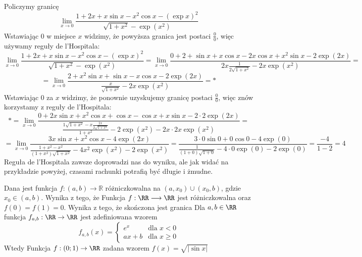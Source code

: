 \begin{example}
    Policzymy granicę
    $$\lim_{x\to0}\frac{1+2x+x\sin{x}-x^2\cos{x}-(\exp{x})^2}{\sqrt{1+x^2}-\exp(x^2)}$$
    Wstawiając 0 w miejsce $x$ widzimy, że powyższa granica jest postaci $\frac{0}{0}$, więc używamy reguły de l'Hospitala:
    $$\lim_{x\to0}\frac{1+2x+x\sin{x}-x^2\cos{x}-(\exp{x})^2}{\sqrt{1+x^2}-\exp(x^2)}=\lim_{x\to0}\frac{0+2+\sin{x}+x\cos{x}-2x\cos{x}+x^2\sin{x}-2\exp(2x)}{2x\frac{1}{2\sqrt{1+x^2}}-2x\exp(x^2)}=$$
    $$=\lim_{x\to0}\frac{2+x^2\sin{x}+\sin{x}-x\cos{x}-2\exp(2x)}{\frac{x}{\sqrt{1+x^2}}-2x\exp(x^2)}=*$$
    Wstawiając 0 za $x$ widzimy, że ponownie uzyskujemy granicę postaci $\frac{0}{0}$, więc znów korzystamy z reguły de l'Hospitala:
    $$*=\lim_{x\to0}\frac{0+2x\sin{x}+x^2\cos{x}+\cos{x}-\cos{x}+x\sin{x}-2\cdot2\exp(2x)}{\frac{1\sqrt{1+x^2}-x\frac{2x}{2\sqrt{1+x^2}}}{1+x^2}-2\exp(x^2)-2x\cdot2x\exp(x^2)}=$$
    $$=\lim_{x\to0}\frac{3x\sin{x}+x^2\cos{x}-4\exp(2x)}{\frac{1+x^2-x^2}{(1+x^2)\sqrt{1+x^2}}-4x^2\exp(x^2)-2\exp(x^2)}=\frac{3\cdot0\sin{0}+0\cos{0}-4\exp(0)}{\frac{1}{(1+0)\sqrt{1+0}}-4\cdot0\exp(0)-2\exp(0)}=\frac{-4}{1-2}=4$$
    Reguła de l'Hospitala zawsze doprowadzi nas do wyniku, ale jak widać na przykładzie powyżej, czasami rachunki potrafią być długie i żmudne.
\end{example}

\begin{problems}
    \prob Dana jest funkcja $f: (a, b) \to \mathbb{R}$ różniczkowalna na $(a, x_0) \cup (x_0, b)$, gdzie $x_0 \in (a,b)$. Wynika z tego, że
    \prob Funkcja $f:\RR\longrightarrow\RR$ jest różniczkowalna oraz $f(0)=f(1)=0$. Wynika z tego, że skończona jest granica
    \prob Dla $a, b \in \RR$ funkcja $f_{a, b} : \RR \to \RR$ jest zdefiniowana wzorem
    \begin{equation*}
    f_{a, b}(x) =
        \begin{cases}
            e^x & \text{dla $x < 0$}\\
            ax + b & \text{dla $x \geq 0$}
        \end{cases}       
    \end{equation*}
    Wtedy
    \prob Funkcja $f:(0;1) \to \RR$ zadana wzorem $f(x) = \sqrt{|\sin{x}|}$
\end{problems}

